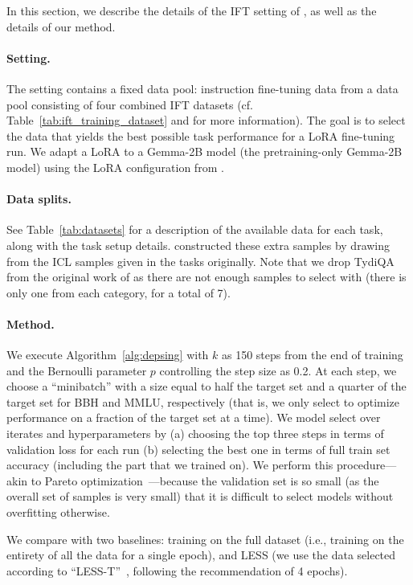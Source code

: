 In this section, we describe the details of the IFT setting of \citet{xia2024less},
as well as the details of our method.

\paragraph{Setting.}
The setting contains a fixed data pool: instruction fine-tuning data from a data
pool consisting of four combined IFT datasets (cf. Table~\ref{tab:ift_training_dataset}
and \citet{xia2024less} for more information). The goal is to select the data
that yields the best possible task performance for a LoRA fine-tuning run.
We adapt a LoRA to a Gemma-2B model (the pretraining-only Gemma-2B model)
using the LoRA configuration from \citet{xia2024less}.

\paragraph{Data splits.}
See Table~\ref{tab:datasets} for a description of the available data for each
task, along with the task setup details. \citet{xia2024less} constructed these
extra samples by drawing from the ICL samples given in the tasks originally.
Note that we drop TydiQA from the original work of \citet{xia2024less} as there
are not enough samples to select with (there is only one from each category, for
a total of 7). 

\paragraph{Method.}
We execute Algorithm~\ref{alg:depsing} with $k$ as 150 steps from the end of training and
the Bernoulli parameter $p$ controlling the step size as 0.2. At each step, we
choose a ``minibatch'' with a size equal to half the target set and a quarter of
the target set for BBH and MMLU, respectively (that is, we only select to
optimize performance on a fraction of the target set at a time). We model
select over iterates and hyperparameters by (a) choosing the top three steps in
terms of validation loss for each run (b) selecting the best one in terms of
full train set accuracy (including the part that we trained on). We perform this
procedure---akin to Pareto optimization~\citep{jin2008pareto}---because the
validation set is so small (as the overall set of samples is very small) that it
is difficult to select models without overfitting otherwise.

We compare with two baselines: training on the full dataset (i.e., training on
the entirety of all the data for a single epoch), and LESS (we use the data
selected according to ``LESS-T''~\citep{xia2024less}, following the
recommendation of 4 epochs).

